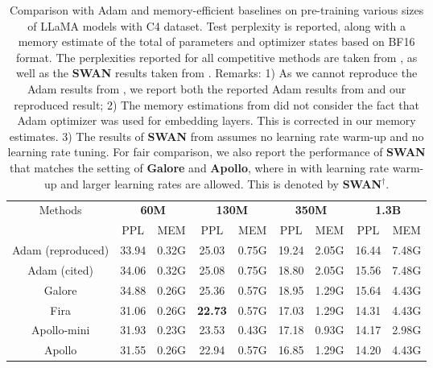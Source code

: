 \begin{table*}[t!]
    \centering
    \caption{\small{Comparison with Adam and  memory-efficient baselines on pre-training various sizes of LLaMA models with C4 dataset. Test perplexity is reported, along with a memory estimate of the total of parameters and optimizer states based on BF16 format. The perplexities reported for all competitive methods are taken from \citet{Zhao2024GaLoreML, zhu2024apollo}, as well as the \textbf{SWAN} results taken from \citet{ma2024swansgdnormalizationwhitening}. Remarks: 1) As we cannot reproduce the Adam results from \citet{Zhao2024GaLoreML}, we report both the reported Adam results from \citet{Zhao2024GaLoreML} and our reproduced result; 2) The memory estimations from \citet{Zhao2024GaLoreML, zhu2024apollo} did not consider the fact that Adam optimizer was used for embedding layers. This is corrected in our memory estimates. 3) The results of \textbf{SWAN} from \citet{ma2024swansgdnormalizationwhitening} assumes no learning rate warm-up and no learning rate tuning. For fair comparison, we also report the performance of \textbf{SWAN} that matches the setting of \textbf{Galore} and \textbf{Apollo}, where in with learning rate warm-up and larger learning rates are allowed. This is denoted by \textbf{SWAN}$^\dag$. }  }
    \label{tab:main}
    \begin{tabular}{|c|cc|cc|cc|cc|}
    \toprule
               Methods & \multicolumn{2}{c|}{\textbf{60M}} & \multicolumn{2}{c|}{\textbf{130M}} & \multicolumn{2}{c|}{\textbf{350M}} & \multicolumn{2}{c|}{\textbf{1.3B}} \\
  
    & PPL & MEM & PPL & MEM & PPL & MEM & PPL & MEM\\
     \midrule 
    Adam (reproduced) & 33.94 & 0.32G  & 25.03 &0.75G        & 19.24 & 2.05G  & 16.44 &7.48G \\
    Adam (cited) &  34.06 & 0.32G  & 25.08 &0.75G        & 18.80 & 2.05G  & 15.56 &7.48G \\
    \midrule 
     
     Galore & 34.88 &0.26G& 25.36& 0.57G &18.95& 1.29G& 15.64& 4.43G\\
    Fira & 31.06 &0.26G& \textbf{22.73} & 0.57G& 17.03& 1.29G& 14.31& 4.43G \\
    Apollo-mini &  31.93 &0.23G& 23.53& 0.43G& 17.18& 0.93G& 14.17& 2.98G \\
    Apollo &  31.55 &0.26G& 22.94& 0.57G& 16.85& 1.29G& 14.20& 4.43G \\


\end{tabular}
\end{table*}
